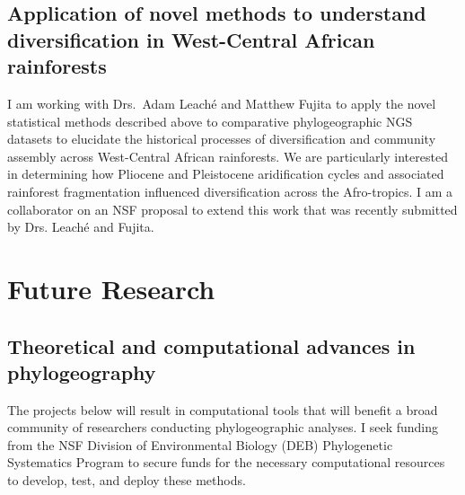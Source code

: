 \subsection*{Application of novel methods to understand diversification
in West-Central African rainforests}
I am working with Drs.\ Adam Leach\'{e} and Matthew Fujita to apply the novel
statistical methods described above to comparative phylogeographic NGS datasets
to elucidate the historical processes of diversification and community assembly
across West-Central African rainforests.
We are particularly interested in determining how Pliocene and Pleistocene
aridification cycles and associated rainforest fragmentation influenced
diversification across the Afro-tropics.
I am a collaborator on an NSF proposal to extend this work that was recently
submitted by Drs. Leach\'{e} and Fujita.


\section*{Future Research}

\subsection*{Theoretical and computational advances in phylogeography}
The projects below will result in computational tools that will benefit a broad
community of researchers conducting phylogeographic analyses. I seek funding
from the NSF Division of Environmental Biology (DEB) Phylogenetic Systematics
Program to secure funds for the necessary computational resources to develop,
test, and deploy these methods.

